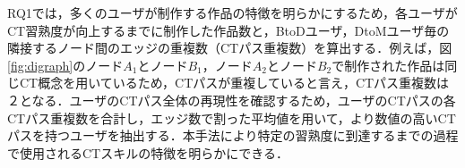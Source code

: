 \documentclass[submit]{ipsj}
\begin{document}


RQ1では，多くのユーザが制作する作品の特徴を明らかにするため，各ユーザがCT習熟度が向上するまでに制作した作品数と，BtoDユーザ，DtoMユーザ毎の隣接するノード間のエッジの重複数（CTパス重複数）を算出する．例えば，図\ref{fig:digraph}のノード$A_1$とノード$B_1$，ノード$A_2$とノード$B_2$で制作された作品は同じCT概念を用いているため，CTパスが重複していると言え，CTパス重複数は２となる．ユーザのCTパス全体の再現性を確認するため，ユーザのCTパスの各CTパス重複数を合計し，エッジ数で割った平均値を用いて，より数値の高いCTパスを持つユーザを抽出する．本手法により特定の習熟度に到達するまでの過程で使用されるCTスキルの特徴を明らかにできる．


\end{document}
